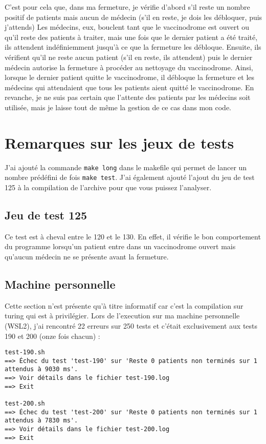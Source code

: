 \documentclass[a4paper]{article}
\begin{document}
\smallskip \newline C'est pour cela que, dans ma fermeture, je vérifie d'abord s'il reste un nombre positif de patients mais aucun de médecin (s'il en reste, je dois les débloquer, puis j'attends)
\smallskip \newline Les médecins, eux, bouclent tant que le vaccinodrome est ouvert ou qu'il reste des patients à traiter, mais une fois que le dernier patient a été traité, ils attendent indéfiniemment jusqu'à ce que la fermeture les débloque. Ensuite, ils vérifient qu'il ne reste aucun patient (s'il en reste, ils attendent) puis le dernier médecin autorise la fermeture à procéder au nettoyage du vaccinodrome. 
\smallskip \newline Ainsi, lorsque le dernier patient quitte le vaccinodrome, il débloque la fermeture et les médecins qui attendaient que tous les patients aient quitté le vaccinodrome.
\smallskip \newline En revanche, je ne suis pas certain que l'attente des patients par les médecins soit utilisée, mais je laisse tout de même la gestion de ce cas dans mon code.

\newpage 

\section{Remarques sur les jeux de tests}

J'ai ajouté la commande \texttt{make long} dans le makefile qui permet de lancer un nombre prédéfini de fois \texttt{make test}. J'ai également ajouté l'ajout du jeu de test 125 à la compilation de l'archive pour que vous puissez l'analyser.

\subsection{Jeu de test 125}

Ce test est à cheval entre le 120 et le 130. En effet, il vérifie le bon comportement du programme lorsqu'un patient entre dans un vaccinodrome ouvert mais qu'aucun médecin ne se présente avant la fermeture.

\subsection{Machine personnelle}

\bigskip Cette section n'est présente qu'à titre informatif car c'est la compilation sur turing qui est à privilégier. \newline Lors de l'execution sur ma machine personnelle (WSL2), j'ai rencontré 22 erreurs sur 250 tests et c'était exclusivement aux tests 190 et 200 (onze fois chacun) :
\begin{verbatim}
test-190.sh
==> Échec du test 'test-190' sur 'Reste 0 patients non terminés sur 1 attendus à 9030 ms'.
==> Voir détails dans le fichier test-190.log
==> Exit

test-200.sh
==> Échec du test 'test-200' sur 'Reste 0 patients non terminés sur 1 attendus à 7830 ms'.
==> Voir détails dans le fichier test-200.log
==> Exit
\end{verbatim}
\end{document}
